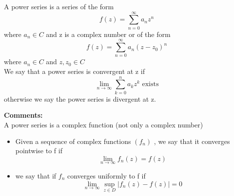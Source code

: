 \begin{definition}{}
A power series is a series of the form$$
    f(z)=\sum_{n=0}^{\infty}a_nz^n
$$ where $ a_n\in C $ and z is a complex number or of the form $$
    f(z)=\sum_{n=0}^{\infty}a_n(z-z_0)^n
$$ where $ a_n\in C $ and $ z,z_0\in C $
\\We say that a power series is convergent at z if $$
    \lim_{n\rightarrow\infty}\sum_{k=0}^{n}a_kz^k \text{ exists}
$$ otherwise we say the power series is divergent at z.
\end{definition}
\textbf{Comments:}  
\\ A power series is a complex function (not only a complex number)
\begin{itemize}
\item Given a sequence of complex functions $ (f_n) $ , we say that it converges pointwise to f if $$
    \lim_{n\rightarrow\infty}f_n(z)=f(z)
$$ 
\item we say that if $ f_n $  converges uniformly to f if $$
    \lim_{n\rightarrow\infty}\sup_{z\in D}|f_n(z)-f(z)|=0
$$
\end{itemize}

